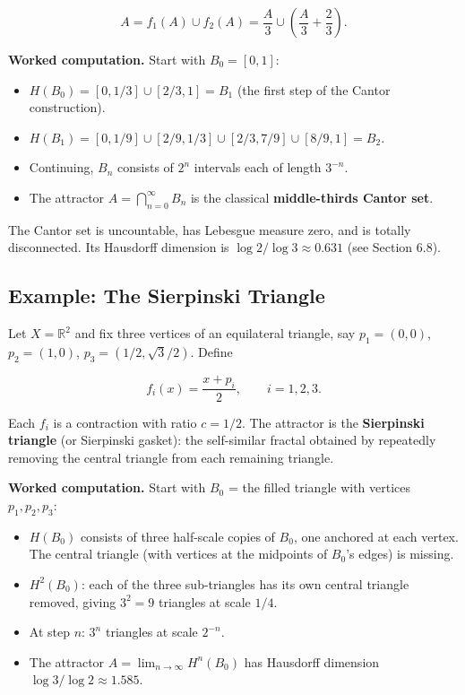\[A = f_1(A) \cup f_2(A) = \frac{A}{3} \cup \left(\frac{A}{3} + \frac{2}{3}\right).\]

\textbf{Worked computation.} Start with $B_0 = [0, 1]$:

\begin{itemize}
\item $H(B_0) = [0, 1/3] \cup [2/3, 1] = B_1$ (the first step of the Cantor construction).
\item $H(B_1) = [0, 1/9] \cup [2/9, 1/3] \cup [2/3, 7/9] \cup [8/9, 1] = B_2$.
\item Continuing, $B_n$ consists of $2^n$ intervals each of length $3^{-n}$.
\item The attractor $A = \bigcap_{n=0}^{\infty} B_n$ is the classical \textbf{middle-thirds Cantor set}.
\end{itemize}

The Cantor set is uncountable, has Lebesgue measure zero, and is totally disconnected. Its Hausdorff dimension is $\log 2 / \log 3 \approx 0.631$ (see Section 6.8).

\subsection*{Example: The Sierpinski Triangle}

Let $X = \mathbb{R}^2$ and fix three vertices of an equilateral triangle, say $p_1 = (0, 0)$, $p_2 = (1, 0)$, $p_3 = (1/2, \sqrt{3}/2)$. Define

\[f_i(x) = \frac{x + p_i}{2}, \qquad i = 1, 2, 3.\]

Each $f_i$ is a contraction with ratio $c = 1/2$. The attractor is the \textbf{Sierpinski triangle} (or Sierpinski gasket): the self-similar fractal obtained by repeatedly removing the central triangle from each remaining triangle.

\textbf{Worked computation.} Start with $B_0$ = the filled triangle with vertices $p_1, p_2, p_3$:

\begin{itemize}
\item $H(B_0)$ consists of three half-scale copies of $B_0$, one anchored at each vertex. The central triangle (with vertices at the midpoints of $B_0$'s edges) is missing.
\item $H^2(B_0)$: each of the three sub-triangles has its own central triangle removed, giving $3^2 = 9$ triangles at scale $1/4$.
\item At step $n$: $3^n$ triangles at scale $2^{-n}$.
\item The attractor $A = \lim_{n \to \infty} H^n(B_0)$ has Hausdorff dimension $\log 3 / \log 2 \approx 1.585$.
\end{itemize}

